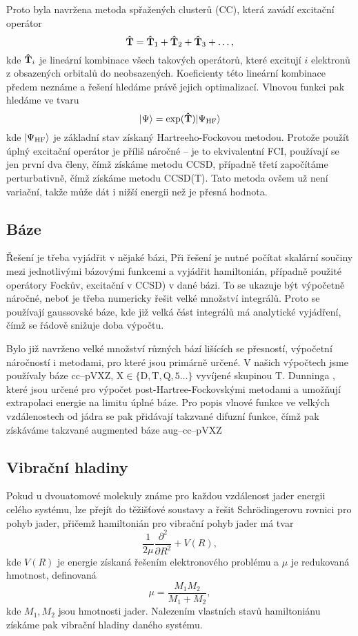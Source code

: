 Proto byla navržena metoda spřažených clusterů (CC), která zavádí excitační operátor
\begin{equation}
\mathbf{\hat{T}} = \mathbf{\hat{T}}_1 + \mathbf{\hat{T}}_2 + \mathbf{\hat{T}}_3 + \dots,
\end{equation}
kde $\mathbf{\hat{T}}_i$ je lineární kombinace všech takových operátorů, které excitují $i$ elektronů z obsazených orbitalů do neobsazených.
Koeficienty této lineární kombinace předem neznáme a řešení hledáme právě
jejich optimalizací.
Vlnovou funkci pak hledáme ve tvaru
\begin{equation}
| \Psi \rangle = \exp(\mathbf{\hat{T}}) | \Psi_\mathrm{HF} \rangle
\end{equation}
kde $| \Psi_\mathrm{HF} \rangle$ je základní stav získaný Hartreeho-Fockovou metodou.
Protože použít úplný excitační operátor je příliš náročné -- je to 
ekvivalentní FCI, používají se jen první dva členy, čímž získáme metodu CCSD, 
případně třetí započítáme perturbativně, čímž získáme metodu CCSD(T). 
Tato metoda ovšem už není variační, takže může dát i nižší energii než je přesná hodnota. 

\subsection{Báze}
Řešení je třeba vyjádřit v nějaké bázi, 
Při řešení je nutné počítat skalární součiny mezi jednotlivými bázovými funkcemi a vyjádřit
hamiltonián, případně použité operátory Fockův, excitační v CCSD) v dané bázi. To se ukazuje být výpočetně náročné, neboť je třeba 
numericky řešit velké množství integrálů. Proto se používají gaussovské báze, kde 
již velká část integrálů má analytické 
vyjádření, čímž se řádově snižuje doba výpočtu.

Bylo již navrženo velké množství různých bází lišících se přesností, výpočetní 
náročností i metodami, pro které jsou primárně určené.
V našich výpočtech jsme používaly báze cc--pVXZ,  $\mathrm{ X \in \{D,T,Q,5\dots\}}$ vyvíjené 
skupinou T. Dunninga \cite{Dunning-basis}, 
které jsou určené pro výpočet post-Hartree-Fockovskými metodami a umožňují extrapolaci 
energie na limitu úplné báze.
Pro popis vlnové funkce ve velkých vzdálenostech od jádra se pak přidávají takzvané 
difuzní funkce, čímž pak získáváme takzvané augmented báze aug--cc--pVXZ


\subsection{Vibrační hladiny}
\label{te_vibr}
Pokud u dvouatomové molekuly známe pro každou vzdálenost jader energii celého systému, 
lze přejít do těžišťové soustavy a řešit Schrödingerovu rovnici pro pohyb jader,
přičemž hamiltonián pro vibrační pohyb jader má tvar
\begin{equation}
\frac{1}{2\mu}\frac{\partial^2}{\partial R^2} + V(R),
\end{equation}
kde $V(R)$ je energie získaná řešením elektronového problému a $\mu$ je redukovaná 
hmotnost, definovaná
\begin{equation}
\mu = \frac{M_1M_2}{M_1+M_2},
\end{equation}
kde $M_1, M_2$ jsou hmotnosti jader. 
Nalezením vlastních stavů hamiltoniánu získáme pak vibrační hladiny daného systému.

